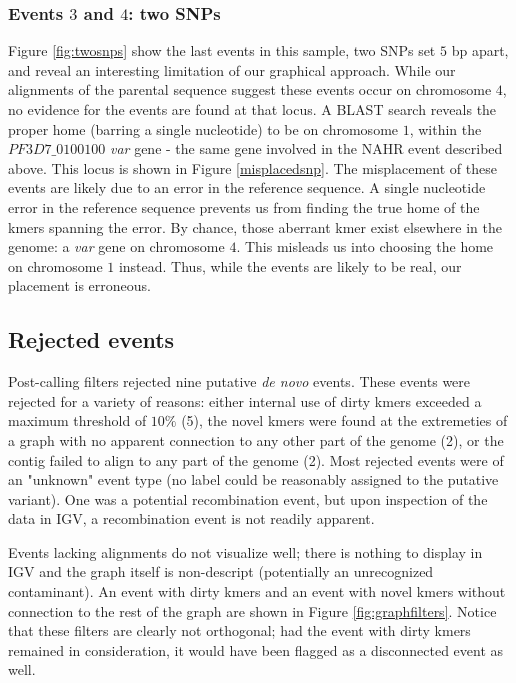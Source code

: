 \subsubsection{Events $3$ and $4$: two SNPs}

Figure \ref{fig:twosnps} show the last events in this sample, two SNPs set $5$ bp apart, and reveal an interesting limitation of our graphical approach.  While our alignments of the parental sequence suggest these events occur on chromosome $4$, no evidence for the events are found at that locus.  A BLAST search reveals the proper home (barring a single nucleotide) to be on chromosome $1$, within the $PF3D7\_0100100$ \textit{var} gene - the same gene involved in the NAHR event described above.  This locus is shown in Figure \ref{misplacedsnp}.  The misplacement of these events are likely due to an error in the reference sequence.  A single nucleotide error in the reference sequence prevents us from finding the true home of the kmers spanning the error.  By chance, those aberrant kmer exist elsewhere in the genome: a \textit{var} gene on chromosome $4$.  This misleads us into choosing the home on chromosome $1$ instead.  Thus, while the events are likely to be real, our placement is erroneous.

\subsection{Rejected events}

Post-calling filters rejected nine putative \textit{de novo} events.  These events were rejected for a variety of reasons: either internal use of dirty kmers exceeded a maximum threshold of $10\%$ (5), the novel kmers were found at the extremeties of a graph with no apparent connection to any other part of the genome (2), or the contig failed to align to any part of the genome (2).  Most rejected events were of an "unknown" event type (no label could be reasonably assigned to the putative variant).  One was a potential recombination event, but upon inspection of the data in IGV, a recombination event is not readily apparent.

Events lacking alignments do not visualize well; there is nothing to display in IGV and the graph itself is non-descript (potentially an unrecognized contaminant).  An event with dirty kmers and an event with novel kmers without connection to the rest of the graph are shown in Figure \ref{fig:graphfilters}.  Notice that these filters are clearly not orthogonal; had the event with dirty kmers remained in consideration, it would have been flagged as a disconnected event as well.

